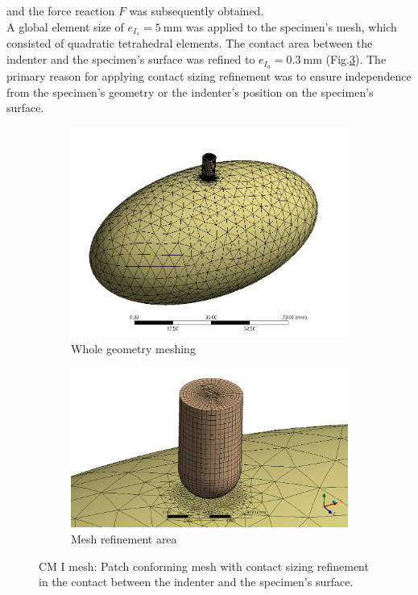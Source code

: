 and the force reaction $F$ was subsequently obtained.\\
A global element size of $e_{I_s}=\SI{5}{\milli\meter}$ was applied to the specimen's mesh, which 
consisted of quadratic tetrahedral elements. The contact area between the indenter and the specimen's surface 
was refined to $e_{I_a}=\SI{0.3}{\milli\meter}$ (Fig.\ref{fig:cpImesh}). The primary reason for applying contact
sizing refinement was to ensure independence from the specimen's geometry or the indenter's position on the specimen's surface.\\
\begin{figure}
    \centering
    \begin{subfigure}[b]{0.45\textwidth}
    \centering
    \includegraphics[width=\textwidth]{Images/computational/MeshCSES03total.png}
    \caption{Whole geometry meshing}
    \label{fig:cp1meshtotal}
    \end{subfigure}
    \hfill
    \begin{subfigure}[b]{0.45\textwidth}
    \centering
    \includegraphics[width=\textwidth]{Images/computational/MeshCSES03.png}
    \caption{Mesh refinement area}
    \label{fig:cp1meshref}
    \end{subfigure}
    \hspace{0.3cm}
    \caption[Computational model I mesh]{CM I mesh: Patch conforming mesh with contact sizing refinement in the contact between the indenter and the specimen's surface.}
    \label{fig:cpImesh}
\end{figure}
